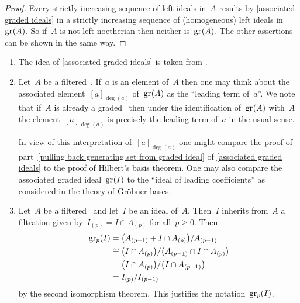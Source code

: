 \begin{proof}
  Every strictly increasing sequence of left ideals in~$A$ results by \cref{associated graded ideals} in a strictly increasing sequence of (homogeneous) left ideals in~$\gr(A)$.
  So if~$A$ is not left noetherian then neither is~$\gr(A)$.
  The other assertions can be shown in the same way.
\end{proof}


\begin{remark}
  \leavevmode
  \begin{enumerate}
    \item
      The idea of \cref{associated graded ideals} is taken from \cite[6.7,~6.9]{noncommutative_noetherian}.
    \item
      Let~$A$ be a filtered~\algebra{$\kf$}.
      If~$a$ is an element of~$A$ then one may think about the associated element~$[a]_{\deg(a)}$ of~$\gr(A)$ as the \enquote{leading term of~$a$}.
      We note that if~$A$ is already a graded~{\algebra{$\kf$}} then under the identification of~$\gr(A)$ with~$A$ the element~$[a]_{\deg(a)}$ is precisely the leading term of~$a$ in the usual sense.
      
      In view of this interpretation of~$[a]_{\deg(a)}$ one might compare the proof of part~\ref{pulling back generating set from graded ideal} of \cref{associated graded ideals} to the proof of Hilbert’s basis theorem.
      One may also compare the associated graded ideal~$\gr(I)$ to the \enquote{ideal of leading coefficients} as considered in the theory of Gröbner bases.
    \item
      Let~$A$ be a filtered~\algebra{$\kf$} and let~$I$ be an ideal of~$A$.
      Then~$I$ inherits from~$A$ a filtration given by~$I_{(p)} = I \cap A_{(p)}$ for all~$p \geq 0$.
      Then
      \begin{align*}
        \gr[p](I)
        &=
        \bigl(A_{(p-1)} + I \cap A_{(p)} \bigr) / A_{(p-1)}
        \\
        &\cong
        \bigl( I \cap A_{(p)} \bigr) / \bigl( A_{(p-1)} \cap I \cap A_{(p)} \bigr)
        \\
        &=
        \bigl( I \cap A_{(p)} \bigr) / \bigl( I \cap A_{(p-1)} \bigr)
        \\
        &=
        I_{(p)} / I_{(p-1)}
      \end{align*}
      by the second isomorphism theorem.
      This justifies the notation~$\gr[p](I)$.
  \end{enumerate}
\end{remark}

